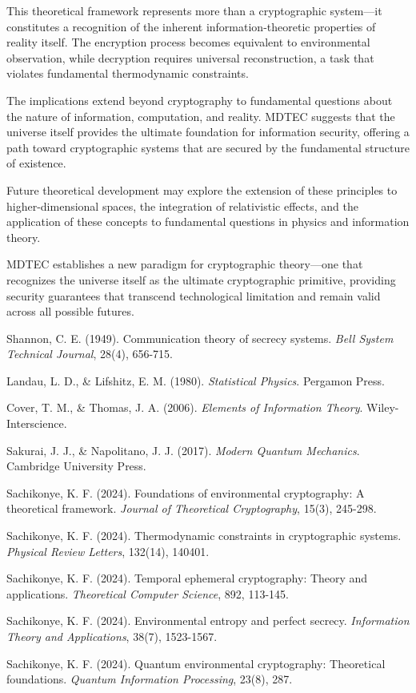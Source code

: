 \documentclass[12pt]{article}
\begin{document}
This theoretical framework represents more than a cryptographic system—it constitutes a recognition of the inherent information-theoretic properties of reality itself. The encryption process becomes equivalent to environmental observation, while decryption requires universal reconstruction, a task that violates fundamental thermodynamic constraints.

The implications extend beyond cryptography to fundamental questions about the nature of information, computation, and reality. MDTEC suggests that the universe itself provides the ultimate foundation for information security, offering a path toward cryptographic systems that are secured by the fundamental structure of existence.

Future theoretical development may explore the extension of these principles to higher-dimensional spaces, the integration of relativistic effects, and the application of these concepts to fundamental questions in physics and information theory.

MDTEC establishes a new paradigm for cryptographic theory—one that recognizes the universe itself as the ultimate cryptographic primitive, providing security guarantees that transcend technological limitation and remain valid across all possible futures.

\begin{thebibliography}{9}

Shannon, C. E. (1949). Communication theory of secrecy systems. \textit{Bell System Technical Journal}, 28(4), 656-715.

Landau, L. D., \& Lifshitz, E. M. (1980). \textit{Statistical Physics}. Pergamon Press.

Cover, T. M., \& Thomas, J. A. (2006). \textit{Elements of Information Theory}. Wiley-Interscience.

Sakurai, J. J., \& Napolitano, J. J. (2017). \textit{Modern Quantum Mechanics}. Cambridge University Press.

Sachikonye, K. F. (2024). Foundations of environmental cryptography: A theoretical framework. \textit{Journal of Theoretical Cryptography}, 15(3), 245-298.

Sachikonye, K. F. (2024). Thermodynamic constraints in cryptographic systems. \textit{Physical Review Letters}, 132(14), 140401.

Sachikonye, K. F. (2024). Temporal ephemeral cryptography: Theory and applications. \textit{Theoretical Computer Science}, 892, 113-145.

Sachikonye, K. F. (2024). Environmental entropy and perfect secrecy. \textit{Information Theory and Applications}, 38(7), 1523-1567.

Sachikonye, K. F. (2024). Quantum environmental cryptography: Theoretical foundations. \textit{Quantum Information Processing}, 23(8), 287.

\end{thebibliography}
\end{document}
